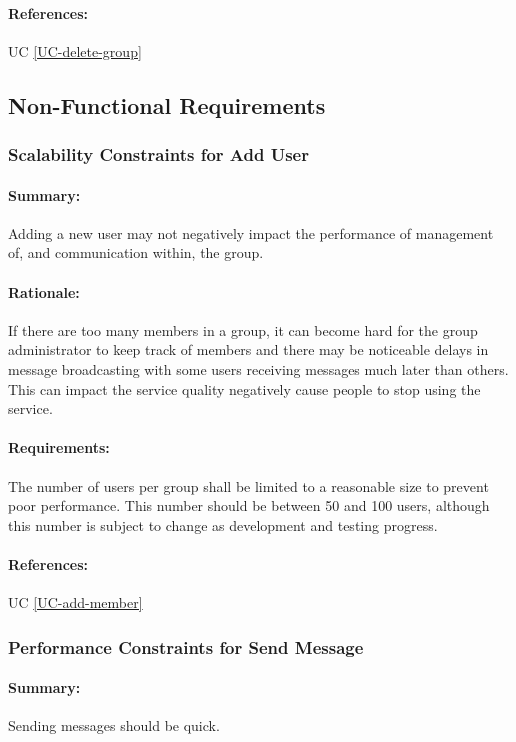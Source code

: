 \documentclass[11pt]{article}
\begin{document}
\paragraph{References:} UC \ref{UC-delete-group}


\subsection{Non-Functional Requirements}

\subsubsection{Scalability Constraints for Add User} \label{NFR-scalability-add-member}
\paragraph{Summary:} Adding a new user may not negatively impact the performance of management of, and communication within, the group.
\paragraph{Rationale:} If there are too many members in a group, it can become hard for the group administrator to keep track of members and there may be noticeable delays in message broadcasting with some users receiving messages much later than others. This can impact the service quality negatively cause people to stop using the service.
\paragraph{Requirements:} The number of users per group shall be limited to a reasonable size to prevent poor performance. This number should be between 50 and 100 users, although this number is subject to change as development and testing progress.
\paragraph{References:} UC \ref{UC-add-member}

\subsubsection{Performance Constraints for Send Message} \label{NFR-performance-send-message}
\paragraph{Summary:} Sending messages should be quick.
\end{document}
